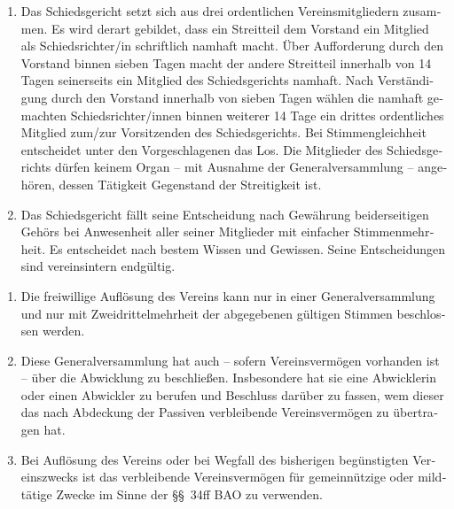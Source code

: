 \begin{otherlanguage}{german}
\begin{enumerate}[statutenenum]
    \item Das Schiedsgericht setzt sich aus drei ordentlichen Vereinsmitgliedern zusammen.
        Es wird derart gebildet, dass ein Streitteil dem Vorstand ein Mitglied als Schiedsrichter/in schriftlich namhaft macht.
        Über Aufforderung durch den Vorstand binnen sieben Tagen macht der andere Streitteil innerhalb von 14 Tagen seinerseits ein Mitglied des Schiedsgerichts namhaft.
        Nach Verständigung durch den Vorstand innerhalb von sieben Tagen wählen die namhaft gemachten Schiedsrichter/innen binnen weiterer 14 Tage ein drittes ordentliches Mitglied zum/zur Vorsitzenden des Schiedsgerichts.
        Bei Stimmengleichheit entscheidet unter den Vorgeschlagenen das Los.
        Die Mitglieder des Schiedsgerichts dürfen keinem Organ -- mit Ausnahme der Generalversammlung -- angehören, dessen Tätigkeit Gegenstand der Streitigkeit ist.

    \item Das Schiedsgericht fällt seine Entscheidung nach Gewährung beiderseitigen Gehörs bei Anwesenheit aller seiner Mitglieder mit einfacher Stimmenmehrheit.
        Es entscheidet nach bestem Wissen und Gewissen.
        Seine Entscheidungen sind vereinsintern endgültig.
\end{enumerate}


\begin{enumerate}[statutenenum]
    \item Die freiwillige Auflösung des Vereins kann nur in einer Generalversammlung und nur mit Zweidrittelmehrheit der abgegebenen gültigen Stimmen beschlossen werden.

    \item Diese Generalversammlung hat auch -- sofern Vereinsvermögen vorhanden ist -- über die Abwicklung zu beschließen.
        Insbesondere hat sie eine Abwicklerin oder einen Abwickler zu berufen und Beschluss darüber zu fassen, wem dieser das nach Abdeckung der Passiven verbleibende Vereinsvermögen zu übertragen hat.

    \item Bei Auflösung des Vereins oder bei Wegfall des bisherigen begünstigten Vereinszwecks ist das verbleibende Vereinsvermögen für gemeinnützige oder mildtätige Zwecke im Sinne der \S\S\ 34ff BAO zu verwenden.
\end{enumerate}

\end{otherlanguage}
